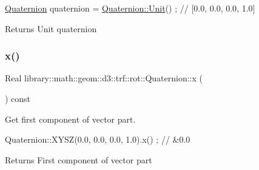 \begin{DoxyCode}
\hyperlink{classlibrary_1_1math_1_1geom_1_1d3_1_1trf_1_1rot_1_1_quaternion_a1b8794cce68c5ee86dd50f9ba53635fa}{Quaternion} quaternion = \hyperlink{classlibrary_1_1math_1_1geom_1_1d3_1_1trf_1_1rot_1_1_quaternion_a8076524c66a805b16dffc27efd11e245}{Quaternion::Unit}() ; \textcolor{comment}{// [0.0, 0.0, 0.0, 1.0]}
\end{DoxyCode}


\begin{DoxyReturn}{Returns}
Unit quaternion 
\end{DoxyReturn}
\mbox{\label{classlibrary_1_1math_1_1geom_1_1d3_1_1trf_1_1rot_1_1_quaternion_ada0e80b8fe8015f8e8ab4398bba947e1}} 
\subsubsection{\texorpdfstring{x()}{x()}}
{\footnotesize\ttfamily Real library\+::math\+::geom\+::d3\+::trf\+::rot\+::\+Quaternion\+::x (\begin{DoxyParamCaption}{ }\end{DoxyParamCaption}) const}



Get first component of vector part. 


\begin{DoxyCode}
Quaternion::XYSZ(0.0, 0.0, 0.0, 1.0).x() ; \textcolor{comment}{// &0.0}
\end{DoxyCode}


\begin{DoxyReturn}{Returns}
First component of vector part 
\end{DoxyReturn}
\mbox{\label{classlibrary_1_1math_1_1geom_1_1d3_1_1trf_1_1rot_1_1_quaternion_a006294eb483bcfc352c2dc36cf19ceec}} 
